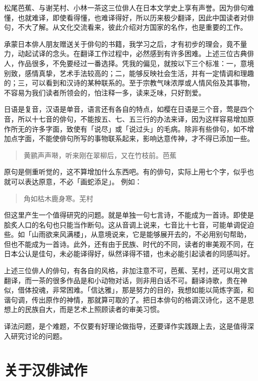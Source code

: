 {  松尾芭蕉、与谢芜村、小林一茶这三位俳人在日本文学史上享有声誉。因为俳句难懂，也就难译，即使看得懂，也难译得好，所以历来极少翻译，因此中国读者对俳句，不大了解。从文化交流看来，彼此介绍对方国家的名作，也是重要的工作。

  承蒙日本俳人朋友赠送关于俳句的书籍，我学习之后，才有初步的理会，竟不量力，动起试译的念头。在翻译工作过程中，必然感到有许多困难。上述三位古典俳人，作品很多，不免要经过一番选择。凭我的偏见，就按以下三个标准：一，意境别致，感情真挚，艺术手法较高的；二，能够反映社会生活，并有一定情调和理趣的；三，可以看到和汉诗的某种联系的。至于宗教气味浓厚或人情风俗及其事物，不容易为我们读者所领会的，怕注释一多，读来乏味，只好割爱。

  日语是复音，汉语是单音，语言还有各自的特点，如樱在日语是三个音，莺是四个音，所以十七音的俳句，不能按五、七、五三行的办法来译，因为这样容易增加原作所无的许多字面，致使有「说尽」或「说过头」的毛病。除非有些俳句，如不增加点字面，不能使俳句所写的事物联系起来，影响达意传神，才不得已添加一些。

  \begin{quote}
      黄鹂声声啭，听来刚在翠柳后，又在竹枝前。\hfill 芭蕉
  \end{quote}

  原句是侧重听觉的，这不算增加什么东西吧。有的俳句，实际上用七个字，似乎也就可以表达原意，不必「画蛇添足」。 例如：

  \begin{quote}
      角如枯木鹿身寒。\hfill 芜村
  \end{quote}

  但这里产生一个值得研究的问题。就是单独一句七言诗，不能成为一首诗。即使是脍炙人口的名句也只能当作断句。这从音调上说来，七音比十七音，可能单调促迫些。如「山雨欲来风满楼」，从意境说来，它是能够展开去的，不必用别句帮助，但也不能成为一首诗。此外，还有由于民族、时代的不同，读者的审美观不同，在日本公认是佳句，未必能译得好，纵然译得不错，也未必能引起读者的同感叫好。

  上述三位俳人的俳句，有各自的风格，非加注意不可，芭蕉、芜村，还可以用文言翻译，而一茶的很多作品是和小动物对话，则非用白话不可。翻译诗歌，贵在神似，借体投魂，非常困难。「信达雅」，那是努力的目的，我想如能以简炼字面，和谐句调，传出原作的神情，那就算可取的了。把日本俳句的格调汉诗化，这不是思想上的民族自大，而是艺术上照顾读者的审美习惯。

  译法问题，是个难题，不仅要有好理论做指导，还要译作实践跟上去，这是值得深入研究讨论的问题。

  \section*{\FS 关于汉俳试作}

}
